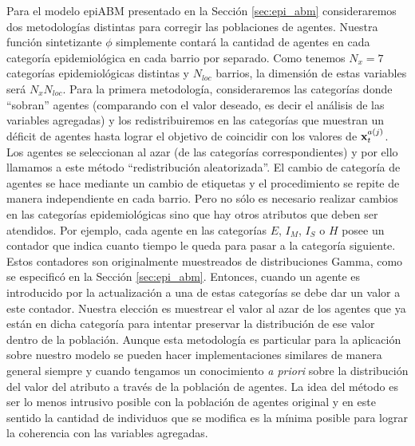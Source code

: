 Para el modelo epiABM presentado en la Sección \ref{sec:epi_abm} consideraremos dos metodologías distintas para corregir las poblaciones de agentes. Nuestra función sintetizante $\phi$ simplemente contará la cantidad de agentes en cada categoría epidemiológica en cada barrio por separado. Como tenemos $N_x = 7$ categorías epidemiológicas distintas y $N_{loc}$ barrios, la dimensión de estas variables será $N_x N_{loc}$. Para la primera metodología, consideraremos las categorías donde ``sobran'' agentes (comparando con el valor deseado, es decir el análisis de las variables agregadas) y los redistribuiremos en las categorías que muestran un déficit de agentes hasta lograr el objetivo de coincidir con los valores de $\mathbf{x}_t^{a(j)}$. Los agentes se seleccionan al azar (de las categorías correspondientes) y por ello llamamos a este método ``redistribución aleatorizada''. El cambio de categoría de agentes se hace mediante un cambio de etiquetas y el procedimiento se repite de manera independiente en cada barrio. Pero no sólo es necesario realizar cambios en las categorías epidemiológicas sino que hay otros atributos que deben ser atendidos. Por ejemplo, cada agente en las categorías $E$, $I_M$, $I_S$ o $H$ posee un contador que indica cuanto tiempo le queda para pasar a la categoría siguiente. Estos contadores son originalmente muestreados de distribuciones Gamma, como se especificó en la Sección \ref{sec:epi_abm}. Entonces, cuando un agente es introducido por la actualización a una de estas categorías se debe dar un valor a este contador. Nuestra elección es muestrear el valor al azar de los agentes que ya están en dicha categoría para intentar preservar la distribución de ese valor dentro de la población. Aunque esta metodología es particular para la aplicación sobre nuestro modelo se pueden hacer implementaciones similares de manera general siempre y cuando tengamos un conocimiento \textit{a priori} sobre la distribución del valor del atributo a través de la población de agentes. La idea del método es ser lo menos intrusivo posible con la población de agentes original y en este sentido la cantidad de individuos que se modifica es la mínima posible para lograr la coherencia con las variables agregadas.


